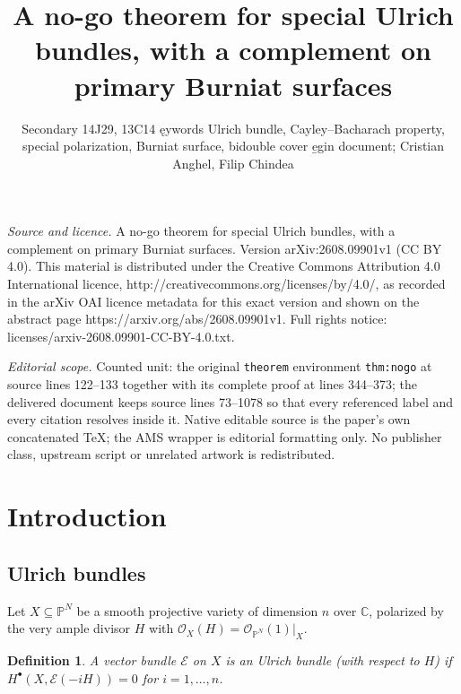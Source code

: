 \documentclass[10pt,a4paper]{amsart}
\newtheorem{definition}[theorem]{Definition}
\newcommand{\OO}{\mathcal{O}}
\newcommand{\EE}{\mathcal{E}}
\newcommand{\CC}{\mathbb{C}}
\newcommand{\PP}{\mathbb{P}}
\begin{document}
\title[A no-go theorem for special Ulrich bundles, with a complemen]{A no-go theorem for special Ulrich bundles, with a complement on primary Burniat surfaces}
\author{Secondary 14J29, 13C14 ęywords Ulrich bundle, Cayley--Bacharach property, special polarization, Burniat surface, bidouble cover e̱gin document; Cristian Anghel, Filip Chindea}
\date{}
\maketitle
\noindent\emph{Source and licence.} A no-go theorem for special Ulrich bundles, with a complement on primary Burniat surfaces. Version arXiv:2608.09901v1 (CC BY 4.0). This material is distributed under the Creative Commons Attribution 4.0 International licence, http://creativecommons.org/licenses/by/4.0/, as recorded in the arXiv OAI licence metadata for this exact version and shown on the abstract page https://arxiv.org/abs/2608.09901v1. Full rights notice: licenses/arxiv-2608.09901-CC-BY-4.0.txt.\par\smallskip
\noindent\textit{Editorial scope.} Counted unit: the original \texttt{theorem} environment \texttt{thm:nogo} at source lines 122--133 together with its complete proof at lines 344--373; the delivered document keeps source lines 73--1078 so that every referenced label and every citation resolves inside it. Native editable source is the paper's own concatenated TeX; the AMS wrapper is editorial formatting only. No publisher class, upstream script or unrelated artwork is redistributed.
\section{Introduction}\label{sec:intro}

\subsection{Ulrich bundles}\label{subsec:ulrich}
Let $X\subseteq\PP^N$ be a smooth projective variety of dimension $n$ over $\CC$, polarized by the very ample divisor $H$ with $\OO_X(H)=\OO_{\PP^N}(1)|_X$.

\begin{definition}\label{def:ulrich}
A vector bundle $\EE$ on $X$ is an \emph{Ulrich bundle} (with respect to $H$) if $H^\bullet(X,\EE(-iH))=0$ for $i=1,\dots,n$.
\end{definition}
\end{document}
